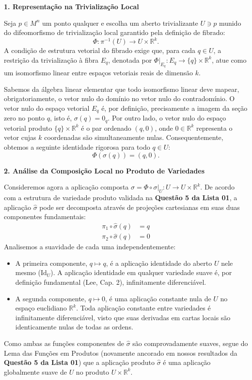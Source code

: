 {	\textbf{1. Representação na Trivialização Local}
	
	Seja $p \in M^n$ um ponto qualquer e escolha um aberto trivializante $U \ni p$ munido do difeomorfismo de trivialização local garantido pela definição de fibrado:
	\begin{equation*}
		\Phi: \pi^{-1}(U) \to U \times \mathbb{R}^k.
	\end{equation*}
	A condição de estrutura vetorial do fibrado exige que, para cada $q \in U$, a restrição da trivialização à fibra $E_q$, denotada por $\Phi|_{E_q} : E_q \to \{q\} \times \mathbb{R}^k$, atue como um isomorfismo linear entre espaços vetoriais reais de dimensão $k$. 
	
	Sabemos da álgebra linear elementar que todo isomorfismo linear deve mapear, obrigatoriamente, o vetor nulo do domínio no vetor nulo do contradomínio. O vetor nulo do espaço vetorial $E_q$ é, por definição, precisamente a imagem da seção zero no ponto $q$, isto é, $\sigma(q) = 0_q$. Por outro lado, o vetor nulo do espaço vetorial produto $\{q\} \times \mathbb{R}^k$ é o par ordenado $(q, 0)$, onde $0 \in \mathbb{R}^k$ representa o vetor cujas $k$ coordenadas são simultaneamente nulas. Consequentemente, obtemos a seguinte identidade rigorosa para todo $q \in U$:
	\begin{equation*}
		\Phi(\sigma(q)) = (q, 0).
	\end{equation*}
	
	\textbf{2. Análise da Composição Local no Produto de Variedades}
	
	Consideremos agora a aplicação composta $\hat{\sigma} = \Phi \circ \sigma|_U : U \to U \times \mathbb{R}^k$. De acordo com a estrutura de variedade produto validada na \textbf{Questão 5 da Lista 01}, a aplicação $\hat{\sigma}$ pode ser decomposta através de projeções cartesianas em suas duas componentes fundamentais:
	\begin{align*}
		\pi_1 \circ \hat{\sigma}(q) &= q \\
		\pi_2 \circ \hat{\sigma}(q) &= 0
	\end{align*}
	Analisemos a suavidade de cada uma independentemente:
	\begin{itemize}
		\item A primeira componente, $q \mapsto q$, é a aplicação identidade do aberto $U$ nele mesmo ($\text{Id}_U$). A aplicação identidade em qualquer variedade suave é, por definição fundamental (Lee, Cap. 2), infinitamente diferenciável.
		\item A segunda componente, $q \mapsto 0$, é uma aplicação constante nula de $U$ no espaço euclidiano $\mathbb{R}^k$. Toda aplicação constante entre variedades é infinitamente diferenciável, visto que suas derivadas em cartas locais são identicamente nulas de todas as ordens.
	\end{itemize}
	Como ambas as funções componentes de $\hat{\sigma}$ são comprovadamente suaves, segue do Lema das Funções em Produtos (novamente ancorado em nossos resultados da \textbf{Questão 5 da Lista 01}) que a aplicação produto $\hat{\sigma}$ é uma aplicação globalmente suave de $U$ no produto $U \times \mathbb{R}^k$.
	
}
